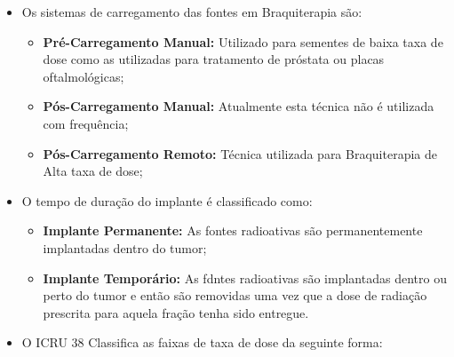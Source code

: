 \documentclass[11pt,a4paper]{article}
\newcounter{exemplo}
\begin{document}
\begin{exemplo}[8. Braquiterapia]
\begin{itemize}
        \item Os sistemas de carregamento das fontes em Braquiterapia são:
        
            \begin{itemize}[label=\textcolor{CarnationPink}{\textopenbullet}]
                \item \textcolor{CarnationPink}{\textbf{Pré-Carregamento Manual:}} Utilizado para sementes de baixa taxa de dose como as utilizadas para tratamento de próstata ou placas oftalmológicas;
                \item \textcolor{CarnationPink}{\textbf{Pós-Carregamento Manual:}}  Atualmente esta técnica não é utilizada com frequência;
                \item \textcolor{CarnationPink}{\textbf{Pós-Carregamento Remoto:}} Técnica utilizada para Braquiterapia de Alta taxa de dose;
            \end{itemize}

        \item O tempo de duração do implante é classificado como:
        
            \begin{itemize}[label=\textcolor{CarnationPink}{\textopenbullet}]
                \item \textcolor{CarnationPink}{\textbf{Implante Permanente:}} As fontes radioativas são permanentemente implantadas dentro do tumor;
                \item \textcolor{CarnationPink}{\textbf{Implante Temporário:}} As fdntes radioativas são implantadas dentro ou perto do tumor e então são removidas uma vez que a dose de radiação prescrita para aquela fração tenha sido entregue.
            \end{itemize}

        \item O ICRU 38 Classifica as faixas de taxa de dose da seguinte forma:
        

\end{itemize}
\end{exemplo}
\end{document}
